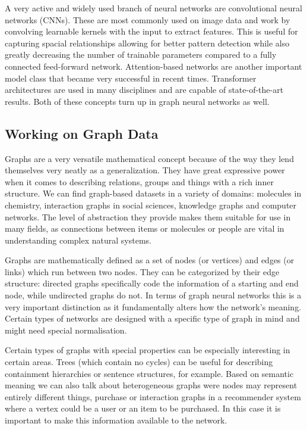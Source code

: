 	A very active and widely used branch of neural networks are convolutional neural networks (CNNs). These are most commonly used on image data and work by convolving learnable kernels with the input to extract features. This is useful for capturing spacial relationships allowing for better pattern detection while also greatly decreasing the number of trainable parameters compared to a fully connected feed-forward network. Attention-based networks are another important model class that became very successful in recent times. Transformer architectures are used in many disciplines and are capable of state-of-the-art results. Both of these concepts turn up in graph neural networks as well.
	
	\subsection{Working on Graph Data}
	
	Graphs are a very versatile mathematical concept because of the way they lend themselves very neatly as a generalization. They have great expressive power when it comes to describing relations, groups and things with a rich inner structure. We can find graph-based datasets in a variety of domains: molecules in chemistry, interaction graphs in social sciences, knowledge graphs and computer networks. The level of abstraction they provide makes them suitable for use in many fields, as connections between items or molecules or people are vital in understanding complex natural systems.
	
	Graphs are mathematically defined as a set of nodes (or vertices) and edges (or links) which run between two nodes. They can be categorized by their edge structure: directed graphs specifically code the information of a starting and end node, while undirected graphs do not. In terms of graph neural networks this is a very important distinction as it fundamentally alters how the network's meaning. Certain types of networks are designed with a specific type of graph in mind and might need special normalisation.
	
	Certain types of graphs with special properties can be especially interesting in certain areas. Trees (which contain no cycles) can be useful for describing containment hierarchies or sentence structures, for example. Based on semantic meaning we can also talk about heterogeneous graphs were nodes may represent entirely different things, purchase or interaction graphs in a recommender system where a vertex could be a user or an item to be purchased. In this case it is important to make this information available to the network.
	
